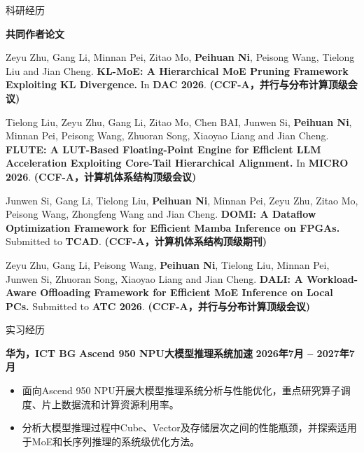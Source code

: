 \documentclass{resume}
\newenvironment{publicationentry}
{\begin{list}{}{
    \setlength{\leftmargin}{1.2em}
    \setlength{\rightmargin}{0em}
    \setlength{\topsep}{2pt}
    \setlength{\partopsep}{0pt}
    \setlength{\parsep}{0pt}
    \setlength{\itemsep}{0pt}
}\item[]}
{\end{list}}
\begin{document}
\begin{rSection}{科研经历}
\vspace{2pt}

\textbf{共同作者论文}

\begin{publicationentry}
Zeyu Zhu, Gang Li, Minnan Pei, Zitao Mo, \textbf{Peihuan Ni},
Peisong Wang, Tielong Liu and Jian Cheng.
\textbf{KL-MoE: A Hierarchical MoE Pruning Framework Exploiting KL Divergence.}
In \textbf{DAC 2026}.
\textbf{(CCF-A，并行与分布计算顶级会议)}
\end{publicationentry}

\begin{publicationentry}
Tielong Liu, Zeyu Zhu, Gang Li, Zitao Mo, Chen BAI, Junwen Si,
\textbf{Peihuan Ni}, Minnan Pei, Peisong Wang, Zhuoran Song,
Xiaoyao Liang and Jian Cheng.
\textbf{FLUTE: A LUT-Based Floating-Point Engine for Efficient LLM
Acceleration Exploiting Core-Tail Hierarchical Alignment.}
In \textbf{MICRO 2026}.
\textbf{(CCF-A，计算机体系结构顶级会议)}
\end{publicationentry}

\begin{publicationentry}
Junwen Si, Gang Li, Tielong Liu, \textbf{Peihuan Ni},
Minnan Pei, Zeyu Zhu, Zitao Mo, Peisong Wang,
Zhongfeng Wang and Jian Cheng.
\textbf{DOMI: A Dataflow Optimization Framework for Efficient Mamba
Inference on FPGAs.}
Submitted to \textbf{TCAD}.
\textbf{(CCF-A，计算机体系结构顶级期刊)}
\end{publicationentry}

\begin{publicationentry}
Zeyu Zhu, Gang Li, Peisong Wang, \textbf{Peihuan Ni},
Tielong Liu, Minnan Pei, Junwen Si, Zhuoran Song,
Xiaoyao Liang and Jian Cheng.
\textbf{DALI: A Workload-Aware Offloading Framework for Efficient MoE
Inference on Local PCs.}
Submitted to \textbf{ATC 2026}.
\textbf{(CCF-A，并行与分布计算顶级会议)}
\end{publicationentry}

\end{rSection}


\begin{rSection}{实习经历}

\textbf{华为，ICT BG}
\hfill
\textbf{Ascend 950 NPU大模型推理系统加速}
\hfill
\textbf{2026年7月 -- 2027年7月}

\begin{itemize}
    \item 面向Ascend 950 NPU开展大模型推理系统分析与性能优化，重点研究算子调度、片上数据流和计算资源利用率。
    \item 分析大模型推理过程中Cube、Vector及存储层次之间的性能瓶颈，并探索适用于MoE和长序列推理的系统级优化方法。
\end{itemize}

\end{rSection}
\end{document}
